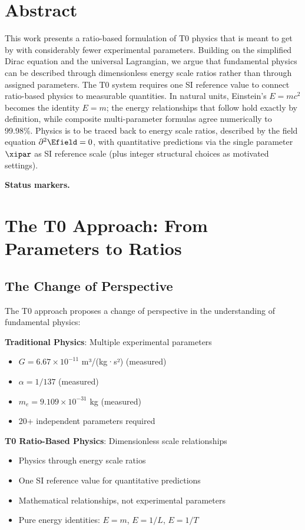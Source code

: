 \section*{Abstract}
		This work presents a ratio-based formulation of T0 physics that is meant to get by with considerably fewer experimental parameters. Building on the simplified Dirac equation and the universal Lagrangian, we argue that fundamental physics can be described through dimensionless energy scale ratios rather than through assigned parameters. The T0 system requires one SI reference value to connect ratio-based physics to measurable quantities. In natural units, Einstein's $E = mc^2$ becomes the identity $E = m$; the energy relationships that follow hold exactly by definition, while composite multi-parameter formulas agree numerically to 99.98\%. Physics is to be traced back to energy scale ratios, described by the field equation $\partial^2 \Efield = 0$, with quantitative predictions via the single parameter $\xipar$ as SI reference scale (plus integer structural choices as motivated settings).

	\medskip\noindent\textbf{Status markers.}
	

	
	
	\section{The T0 Approach: From Parameters to Ratios}
	
	\subsection{The Change of Perspective}
	
	The T0 approach proposes a change of perspective in the understanding of fundamental physics:
	
	\begin{tcolorbox}[colback=red!5!white,colframe=red!75!black,title=Comparison]
		\textbf{Traditional Physics}: Multiple experimental parameters
		\begin{itemize}
			\item $G = 6.67 \times 10^{-11}$ m³/(kg·s²) (measured)
			\item $\alpha = 1/137$ (measured)
			\item $m_e = 9.109 \times 10^{-31}$ kg (measured)
			\item 20+ independent parameters required
		\end{itemize}
		
		\textbf{T0 Ratio-Based Physics}: Dimensionless scale relationships
		\begin{itemize}
			\item Physics through energy scale ratios
			\item One SI reference value for quantitative predictions
			\item Mathematical relationships, not experimental parameters
			\item Pure energy identities: $E = m$, $E = 1/L$, $E = 1/T$
		\end{itemize}
	\end{tcolorbox}
	
